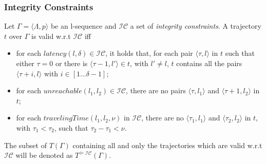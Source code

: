 \begin{frame}
\frametitle{Integrity Constraints}

\begin{definition}
  Let $\Gamma = \langle \Lambda, p \rangle$ be an l-sequence and $\mathcal{IC}$ a set of \emph{integrity constraints}. A trajectory $t$ over $\Gamma$ is valid w.r.t $\mathcal{IC}$ iff
  \begin{itemize}

    \item for each $latency(l, \delta) \in \mathcal{IC}$, it holds that, for each pair $\langle \tau,l \rangle$ in $t$ such that either $\tau = 0$ or there is $\langle \tau-1, l' \rangle \in t$, with $l' \neq l$, $t$ contains all the pairs $\langle \tau+i,l \rangle$ with $i \in [1...\delta-1]$;

    \item for each $unreachable(l_1, l_2) \in \mathcal{IC}$, there are no pairs $\langle \tau,l_1 \rangle$ and $\langle \tau+1,l_2 \rangle$ in $t$;

    \item for each $travelingTime(l_1, l_2, \nu)$ in $\mathcal{IC}$, there are no $\langle \tau_1, l_1 \rangle$ and $\langle \tau_2, l_2 \rangle$ in $t$, with $\tau_1 < \tau_2$, such that $\tau_2 - \tau_1 < \nu$.

  \end{itemize}
\end{definition}

\textrm{The subset of $T(\Gamma)$ containing all and only the trajectories which are valid w.r.t $\mathcal{IC}$ will be denoted as $T^{\models\mathcal{IC}}(\Gamma)$.}

\end{frame}


